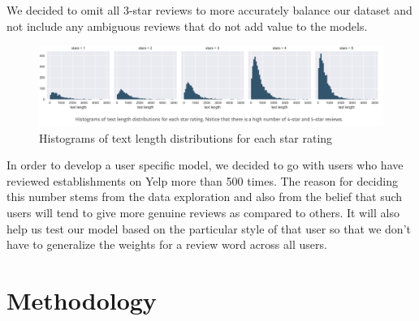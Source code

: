 \documentclass[letterpaper, 10 pt, conference]{ieeeconf}  %
\begin{document}
We decided to omit all 3-star reviews to more accurately balance our dataset and not include any ambiguous reviews that do not add value to the models.

\begin{figure}[htb]
\includegraphics[width=\linewidth]{img/stars.png}
\caption{Histograms of text length distributions for each star rating}
\label{fig:4}
\end{figure}
In order to develop a user specific model, we decided to go with users who have reviewed establishments on Yelp more than 500 times. The reason for deciding this number stems from the data exploration and also from the belief that such users will tend to give more genuine reviews as compared to others. It will also help us test our model based on the particular style of that user so that we don't have to generalize the weights for a review word across all users.

\section{Methodology}
\end{document}
